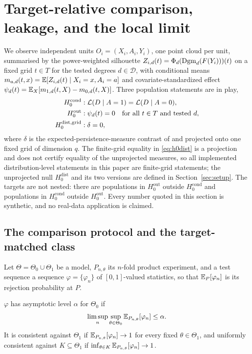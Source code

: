 \section{Target-relative comparison, leakage, and the local limit}
\label{sec:theory-leakage}

We observe independent units $O_i=(X_i,A_i,Y_i)$, one point cloud per unit, summarised by the power-weighted silhouette $Z_{i,d}(t)=\Phi_d(\mathrm{Dgm}_d(F(Y_i)))(t)$ on a fixed grid $t\in T$ for the tested degrees $d\in\mathcal D$, with conditional means $m_{a,d}(t,x)=\mathbb{E}[Z_{i,d}(t)\mid X_i=x,A_i=a]$ and covariate-standardized effect $\psi_d(t)=\mathbb{E}_X[m_{1,d}(t,X)-m_{0,d}(t,X)]$. Three population statements are in play,
\begin{align}
H_0^{\mathrm{cond}} &: \mathcal{L}(D\mid A=1)=\mathcal{L}(D\mid A=0), \label{eq:h0cond}\\
H_0^{\mathrm{out}} &: \psi_d(t)=0 \quad \text{for all } t\in T \text{ and tested } d, \label{eq:h0out}\\
H_0^{\mathrm{dist,grid}} &: \delta=0, \label{eq:h0dist}
\end{align}
where $\delta$ is the expected-persistence-measure contrast of \citet{divol_chazal_2020} and \citet{divol_lacombe_2021} projected onto one fixed grid of dimension $q$. The finite-grid equality in \eqref{eq:h0dist} is a projection and does not certify equality of the unprojected measures, so all implemented distribution-level statements in this paper are finite-grid statements; the unprojected null $H_0^{\mathrm{dist}}$ and its two versions are defined in Section~\ref{sec:setup}. The targets are not nested: there are populations in $H_0^{\mathrm{out}}$ outside $H_0^{\mathrm{cond}}$ and populations in $H_0^{\mathrm{cond}}$ outside $H_0^{\mathrm{out}}$. Every number quoted in this section is synthetic, and no real-data application is claimed.

\subsection{The comparison protocol and the target-matched class}
\label{sec:protocol}

Let $\Theta=\Theta_0\cup\Theta_1$ be a model, $P_{n,\theta}$ its $n$-fold product experiment, and a test sequence a sequence $\varphi=\{\varphi_n\}$ of $[0,1]$-valued statistics, so that $\mathbb{E}_{P}[\varphi_n]$ is its rejection probability at $P$.

\begin{definition}
\label{def:level}
$\varphi$ has asymptotic level $\alpha$ for $\Theta_0$ if
\[
\limsup_n\sup_{\theta\in\Theta_0}\mathbb{E}_{P_{n,\theta}}[\varphi_n]\le\alpha.
\]
It is consistent against $\Theta_1$ if $\mathbb{E}_{P_{n,\theta}}[\varphi_n]\to1$ for every fixed $\theta\in\Theta_1$, and uniformly consistent against $K\subseteq\Theta_1$ if $\inf_{\theta\in K}\mathbb{E}_{P_{n,\theta}}[\varphi_n]\to1$.
\end{definition}

